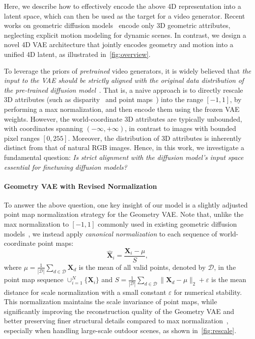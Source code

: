 Here, we describe how to effectively encode the above 4D representation into a latent space,
which can then be used as the target for a video generator.
Recent works on geometric diffusion models~\cite{ke2024repurposing,zhang2024world,jiang2025geo4d} encode only 3D geometric attributes, neglecting explicit motion modeling for dynamic scenes.
In contrast, we design a novel 4D VAE architecture that jointly encodes geometry and motion into a unified 4D latent,
as illustrated in~\cref{fig:overview}.

To leverage the priors of \emph{pretrained} video generators,
it is widely believed that
\emph{the input to the VAE should be strictly aligned with the original data distribution of the pre-trained diffusion model}~\cite{ke2024repurposing, zhang2024world, jiang2025geo4d}.
That is,
a naive approach is to directly rescale 3D attributes (such as disparity~\cite{ke2024repurposing} and point maps~\cite{zhang2024world}) into the range $[-1, 1]$,
by performing a max normalization,
and then encode them using the frozen VAE weights.
However,
the world-coordinate 3D attributes are typically unbounded, with coordinates spanning $(-\infty, +\infty)$,
in contrast to images with bounded pixel ranges $[0, 255]$.
Moreover, the distribution of 3D attributes is inherently distinct from that of natural RGB images.
Hence,
in this work,
we investigate a fundamental question:
\emph{Is strict alignment with the diffusion model's input space essential for finetuning diffusion models?}




\paragraph{Geometry VAE with Revised Normalization}
To answer the above question,
one key insight of our model is a slightly adjusted point map normalization strategy for the Geometry VAE.
Note that,
unlike the max normalization to $[-1, 1]$ commonly used in existing geometric diffusion models~\cite{ke2024repurposing,zhang2024world,jiang2025geo4d},
we instead apply \emph{canonical normalization} to each sequence of world-coordinate point maps:
\begin{equation}
    \label{eq:normalization}
    \hat{\bm{X}}_i = \frac{\bm{X}_i-\mu}{S},
\end{equation}
where
$\mu=\frac{1}{|\mathcal{D}|}\sum_{d\in\mathcal{D}} \bm{X}_d$
is the mean of all valid points,
denoted by
$\mathcal{D}$,
in the point map sequence
$\cup_{i=1}^N\{\bm{X}_i\}$
and
$S=\frac{1}{|\mathcal{D}|}\sum_{d\in\mathcal{D}} \big\| \bm{X}_d - \mu \big\|_2 + \varepsilon$ 
is the mean distance for scale normalization with a small constant
$\varepsilon$
for numerical stability.
This normalization maintains the scale invariance of point maps,
while significantly improving the reconstruction quality of the Geometry VAE and better preserving finer structural details compared to max normalization~\cite{wang2024dust3r,wang2025vggt},
especially when handling large-scale outdoor scenes, as shown in~\cref{fig:rescale}.

